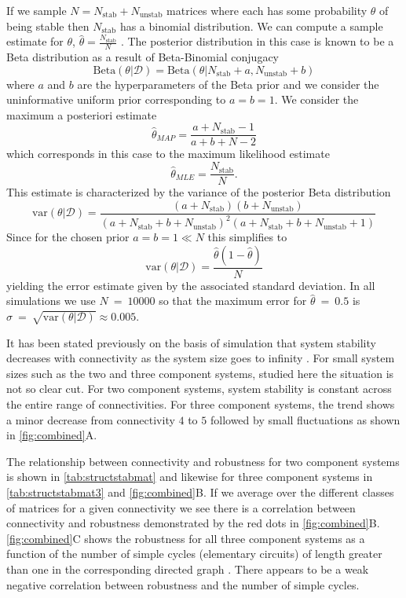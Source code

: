 If we sample $N = N_{\mathrm{stab}} + N_{\mathrm{unstab}}$ matrices where each has some probability $\theta$ of being stable then $N_{\mathrm{stab}}$ has a binomial distribution. We can compute a sample estimate for $\theta$, $\hat{\theta} = \frac{N_{\mathrm{stab}}}{N}$ \cite{Murphy2012}. The posterior distribution in this case is known to be a Beta distribution as a result of Beta-Binomial conjugacy
$$
\mathrm{Beta}(\theta | \mathcal{D}) = \mathrm{Beta}(\theta | N_{\mathrm{stab}} + a, N_{\mathrm{unstab}} + b)
$$
where $a$ and $b$ are the hyperparameters of the Beta prior and we consider the uninformative uniform prior corresponding to $a=b=1$. We consider the maximum a posteriori estimate
$$\hat{\theta}_{MAP} = \frac{a + N_{\mathrm{stab}} - 1}{a + b + N - 2}$$
which corresponds in this case to the maximum likelihood estimate
$$
\hat{\theta}_{MLE} = \frac{N_{\mathrm{stab}}}{N}.
$$
This estimate is characterized by the variance of the posterior Beta distribution
$$
\mathrm{var}(\theta | \mathcal{D}) = \frac{(a+N_{\mathrm{stab}})(b+N_{\mathrm{unstab}})}{(a + N_{\mathrm{stab}} + b + N_{\mathrm{unstab}})^2(a + N_{\mathrm{stab}} + b + N_{\mathrm{unstab}}+1)}
$$
Since for the chosen prior $a=b=1 \ll N$ this simplifies to
$$
\mathrm{var}(\theta | \mathcal{D}) = \frac{\hat{\theta}(1-\hat{\theta})}{N}
$$
yielding the error estimate given by the associated standard deviation. In all simulations we use $N~=~10000$ so that the maximum error for $\hat{\theta}~=~0.5$ is $\sigma~=~\sqrt{\mathrm{var}(\theta | \mathcal{D})} \approx 0.005$.

It has been stated previously on the basis of simulation that system stability decreases with connectivity as the system size goes to infinity \cite{May1972}. For small system sizes such as the two and three component systems, studied here the situation is not so clear cut. For two component systems, system stability is constant across the entire range of connectivities. For three component systems, the trend shows a minor decrease from connectivity $4$ to $5$ followed by small fluctuations as shown in \ref{fig:combined}A.

The relationship between connectivity and robustness for two component systems is shown in \ref{tab:structstabmat} and likewise for three component systems in \ref{tab:structstabmat3} and \ref{fig:combined}B. If we average over the different classes of matrices for a given connectivity we see there is a correlation between connectivity and robustness demonstrated by the red dots in \ref{fig:combined}B.
\ref{fig:combined}C shows the robustness for all three component systems as a function of the number of simple cycles (elementary circuits) of length greater than one in the corresponding directed graph \cite{Johnson1975}. There appears to be a weak negative correlation between robustness and the number of simple cycles.

